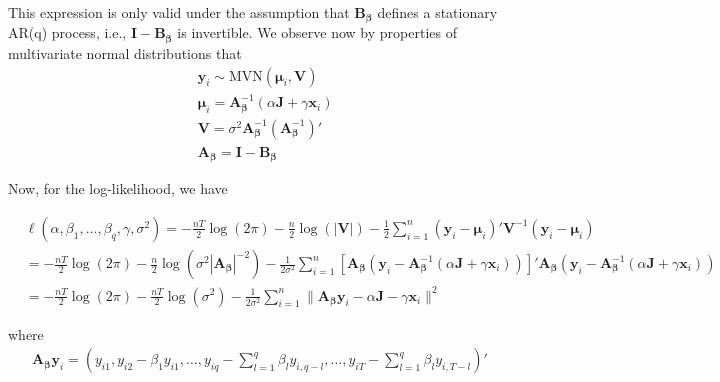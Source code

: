 \documentclass{article}
\begin{document}
\noindent This expression is only valid under the assumption that $\mathbf{B}_{\boldsymbol{\beta}}$ defines a stationary AR(q) process, i.e., $\mathbf{I} - \mathbf{B}_{\boldsymbol{\beta}}$ is invertible. We observe now by properties of multivariate normal distributions that
\begin{align*}
    & \mathbf{y}_i \sim \text{MVN}(\boldsymbol{\mu}_i, \mathbf{V}) \\
    & \boldsymbol{\mu}_i = \mathbf{A}_{\boldsymbol{\beta}}^{-1} (\alpha \mathbf{J}+\gamma \mathbf{x}_i) \\
    & \mathbf{V} = \sigma^2 \mathbf{A}_{\boldsymbol{\beta}}^{-1} (\mathbf{A}_{\boldsymbol{\beta}}^{-1})' \\
    & \mathbf{A}_{\boldsymbol{\beta}} = \mathbf{I}-\mathbf{B}_{\boldsymbol{\beta}}
\end{align*}


\noindent Now, for the log-likelihood, we have



\begin{align*}
    & \ell(\alpha,\beta_1,\ldots,\beta_q, \gamma,\sigma^2)=-\frac{nT}{2} \log(2\pi)-\frac{n}{2} \log (|\mathbf{V}|)-\frac{1}{2}\sum_{i=1}^n (\mathbf{y}_i-\boldsymbol{\mu}_i)' \mathbf{V}^{-1} (\mathbf{y}_i-\boldsymbol{\mu}_i) \\ 
    & =-\frac{nT}{2} \log(2\pi) -\frac{n}{2} \log(\sigma^{2}|\mathbf{A}_{\boldsymbol{\beta}}|^{-2}) -\frac{1}{2\sigma^2} \sum_{i=1}^n [\mathbf{A}_{\boldsymbol{\beta}}(\mathbf{y}_i-\mathbf{A}_{\boldsymbol{\beta}}^{-1}(\alpha \mathbf{J} + \gamma \mathbf{x}_i))]' \mathbf{A}_{\boldsymbol{\beta}}(\mathbf{y}_i-\mathbf{A}_{\boldsymbol{\beta}}^{-1}(\alpha \mathbf{J} + \gamma \mathbf{x}_i))\\
    & = -\frac{nT}{2} \log(2\pi)-\frac{nT}{2} \log (\sigma^2)-\frac{1}{2\sigma^2}\sum_{i=1}^n  \|\mathbf{A}_{\boldsymbol{\beta}}\mathbf{y}_i- \alpha \mathbf{J}-\gamma \mathbf{x}_i\|^2
\end{align*}

\noindent where
\begin{align*}
    \mathbf{A}_{\boldsymbol{\beta}} \mathbf{y}_i=(y_{i1}, y_{i2}-\beta_1 y_{i1}, \ldots, y_{iq}-\sum_{l=1}^q \beta_l y_{i,q-l}, \ldots, y_{iT}-\sum_{l=1}^q \beta_l y_{i,T-l})'
\end{align*}
\end{document}
